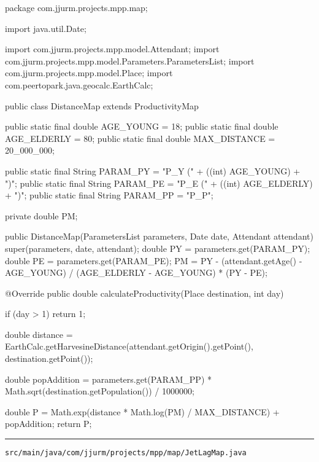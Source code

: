 \begin{javacode}
package com.jjurm.projects.mpp.map;

import java.util.Date;

import com.jjurm.projects.mpp.model.Attendant;
import com.jjurm.projects.mpp.model.Parameters.ParametersList;
import com.jjurm.projects.mpp.model.Place;
import com.peertopark.java.geocalc.EarthCalc;

public class DistanceMap extends ProductivityMap {

  public static final double AGE_YOUNG = 18;
  public static final double AGE_ELDERLY = 80;
  public static final double MAX_DISTANCE = 20_000_000;

  public static final String PARAM_PY = "P_Y (" + ((int) AGE_YOUNG) + ")";
  public static final String PARAM_PE = "P_E (" + ((int) AGE_ELDERLY) + ")";
  public static final String PARAM_PP = "P_P";

  private double PM;

  public DistanceMap(ParametersList parameters, Date date, Attendant attendant) {
    super(parameters, date, attendant);
    double PY = parameters.get(PARAM_PY);
    double PE = parameters.get(PARAM_PE);
    PM = PY - (attendant.getAge() - AGE_YOUNG) / (AGE_ELDERLY - AGE_YOUNG) * (PY - PE);
  }

  @Override
  public double calculateProductivity(Place destination, int day) {
    if (day > 1)
      return 1;

    double distance =
        EarthCalc.getHarvesineDistance(attendant.getOrigin().getPoint(), destination.getPoint());

    double popAddition =
        parameters.get(PARAM_PP) * Math.sqrt(destination.getPopulation()) / 1000000;

    double P = Math.exp(distance * Math.log(PM) / MAX_DISTANCE) + popAddition;
    return P;
  }
}
\end{javacode}

\noindent\rule{\textwidth}{0.4pt}

\nointerlineskip
\texttt{src/main/java/com/jjurm/projects/mpp/map/JetLagMap.java}

